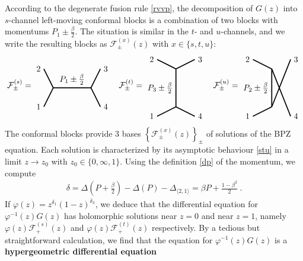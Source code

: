 \documentclass[12pt, a4paper]{article}
\theoremstyle{break}
\begin{document}
According to the degenerate fusion rule \eqref{rvvp}, the decomposition of $G(z)$ into $s$-channel left-moving conformal blocks is a combination of two blocks with momentums $P_1\pm \frac{\beta}{2}$. The situation is similar in the $t$- and $u$-channels, and we write the resulting blocks as $\mathcal{F}^{(x)}_\pm(z)$ with $x\in\{s,t,u\}$:
\begin{align}
\mathcal{F}^{(s)}_\pm = 
 \begin{tikzpicture}[baseline=(current  bounding  box.center), very thick, scale = .4]
\draw (-1,2) node [left] {$2$} -- (0,0) -- node [above] {$P_1\pm\frac{\beta}{2}$} (4,0) -- (5,2) node [right] {$3$};
\draw (-1,-2) node [left] {$1$} -- (0,0);
\draw (4,0) -- (5,-2) node [right] {$4$};
\end{tikzpicture}
\quad 
\mathcal{F}^{(t)}_\pm = 
\begin{tikzpicture}[baseline=(current  bounding  box.center), very thick, scale = .4]
 \draw (-2,3) node [left] {$2$} -- (0,2) -- node [left] {$P_3\pm\frac{\beta}{2}$} (0,-2) -- (-2, -3) node [left] {$1$};
\draw (0,2) -- (2,3) node [right] {$3$};
\draw (0,-2) -- (2, -3) node [right] {$4$};
\end{tikzpicture}
\quad 
\mathcal{F}^{(u)}_\pm = 
\begin{tikzpicture}[baseline=(current  bounding  box.center), very thick, scale = .4]
\draw (-2,1) node [left] {$2$} -- (0,0) -- node [left] {$P_2\pm \frac{\beta}{2}$} (0,-4) ;
\draw (0,0)-- (2,-5) node [right] {$4$};
\draw (-2,-5) node [left] {$1$} -- (0,-4);
\draw (0,-4) -- (2,1) node [right] {$3$};
\end{tikzpicture} 
\end{align}
The conformal blocks provide 3 bases $\left\{\mathcal{F}^{(x)}_\pm(z)\right\}_\pm$ of solutions of the BPZ equation. Each solution is characterized by its asymptotic behaviour \eqref{stu} in a limit $z\to z_0$ with $z_0\in\{0,\infty,1\}$. Using the definition \eqref{dp} of the momentum, we compute 
\begin{align}
 \delta=\Delta\left(P+\tfrac{\beta}{2}\right) - \Delta(P) -\Delta_{\langle 2,1\rangle} = \beta P + \tfrac{1-\beta^2}{2}\ .
\end{align}
If $\varphi(z) = z^{\delta_1}(1-z)^{\delta_3}$, we deduce that the differential equation for $\varphi^{-1}(z) G(z)$ has holomorphic solutions near $z=0$ and near $z=1$, namely $\varphi(z)\mathcal{F}^{(s)}_+(z)$ and $\varphi(z)\mathcal{F}^{(t)}_+(z)$ respectively. By a tedious but straightforward calculation, we find that the equation for $\varphi^{-1}(z) G(z)$ is a \textbf{hypergeometric differential equation} 
\end{document}
